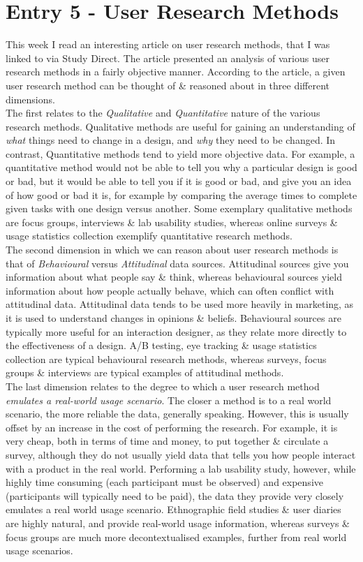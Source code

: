 \documentclass{article}
\begin{document}
\section*{Entry 5 - User Research Methods}

\noindent This week I read an interesting article on user research methods, that I was linked to via Study Direct. The article presented an analysis of various user research methods in a fairly objective manner. According to the article, a given user research method can be thought of \& reasoned about in three different dimensions.
\\\indent The first relates to the \emph{Qualitative} and \emph{Quantitative} nature of the various research methods. Qualitative methods are useful for gaining an understanding of \emph{what} things need to change in a design, and \emph{why} they need to be changed. In contrast, Quantitative methods tend to yield more objective data. For example, a quantitative method would not be able to tell you why a particular design is good or bad, but it would be able to tell you if it is good or bad, and give you an idea of how good or bad it is, for example by comparing the average times to complete given tasks with one design versus another. Some exemplary qualitative methods are focus groups, interviews \& lab usability studies, whereas online surveys \& usage statistics collection exemplify quantitative research methods.
\\\indent The second dimension in which we can reason about user research methods is that of \emph{Behavioural} versus \emph{Attitudinal} data sources. Attitudinal sources give you information about what people say \& think, whereas behavioural sources yield information about how people actually behave, which can often conflict with attitudinal data. Attitudinal data tends to be used more heavily in marketing, as it is used to understand changes in opinions \& beliefs. Behavioural sources are typically more useful for an interaction designer, as they relate more directly to the effectiveness of a design. A/B testing, eye tracking \& usage statistics collection are typical behavioural research methods, whereas surveys, focus groups \& interviews are typical examples of attitudinal methods.
\\\indent The last dimension relates to the degree to which a user research method \emph{emulates a real-world usage scenario}. The closer a method is to a real world scenario, the more reliable the data, generally speaking. However, this is usually offset by an increase in the cost of performing the research. For example, it is very cheap, both in terms of time and money, to put together \& circulate a survey, although they do not usually yield data that tells you how people interact with a product in the real world. Performing a lab usability study, however, while highly time consuming (each participant must be observed) and expensive (participants will typically need to be paid), the data they provide very closely emulates a real world usage scenario. Ethnographic field studies \& user diaries are highly natural, and provide real-world usage information, whereas surveys \& focus groups are much more decontextualised examples, further from real world usage scenarios.
\end{document}
